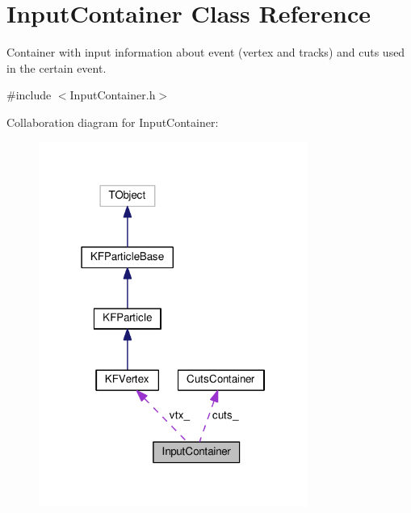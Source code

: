 \hypertarget{classInputContainer}{}\section{Input\+Container Class Reference}
\label{classInputContainer}


Container with input information about event (vertex and tracks) and cuts used in the certain event.  




{\ttfamily \#include $<$Input\+Container.\+h$>$}



Collaboration diagram for Input\+Container\+:\nopagebreak
\begin{figure}[H]
\begin{center}
\leavevmode
\includegraphics[width=250pt]{classInputContainer__coll__graph}
\end{center}
\end{figure}

